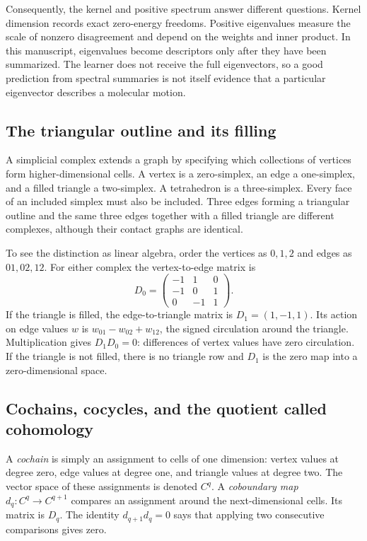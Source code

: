Consequently, the kernel and positive spectrum answer different questions. Kernel dimension records exact zero-energy freedoms. Positive eigenvalues measure the scale of nonzero disagreement and depend on the weights and inner product. In this manuscript, eigenvalues become descriptors only after they have been summarized. The learner does not receive the full eigenvectors, so a good prediction from spectral summaries is not itself evidence that a particular eigenvector describes a molecular motion.

\subsection{The triangular outline and its filling}
A simplicial complex extends a graph by specifying which collections of vertices form higher-dimensional cells. A vertex is a zero-simplex, an edge a one-simplex, and a filled triangle a two-simplex. A tetrahedron is a three-simplex. Every face of an included simplex must also be included. Three edges forming a triangular outline and the same three edges together with a filled triangle are different complexes, although their contact graphs are identical.

To see the distinction as linear algebra, order the vertices as $0,1,2$ and edges as $01,02,12$. For either complex the vertex-to-edge matrix is
\begin{equation}
D_0=\begin{pmatrix}-1&1&0\\-1&0&1\\0&-1&1\end{pmatrix}.
\end{equation}
If the triangle is filled, the edge-to-triangle matrix is $D_1=(1,-1,1)$. Its action on edge values $w$ is $w_{01}-w_{02}+w_{12}$, the signed circulation around the triangle. Multiplication gives $D_1D_0=0$: differences of vertex values have zero circulation. If the triangle is not filled, there is no triangle row and $D_1$ is the zero map into a zero-dimensional space.

\subsection{Cochains, cocycles, and the quotient called cohomology}
A \emph{cochain} is simply an assignment to cells of one dimension: vertex values at degree zero, edge values at degree one, and triangle values at degree two. The vector space of these assignments is denoted $C^q$. A \emph{coboundary map} $d_q:C^q\to C^{q+1}$ compares an assignment around the next-dimensional cells. Its matrix is $D_q$. The identity $d_{q+1}d_q=0$ says that applying two consecutive comparisons gives zero.


